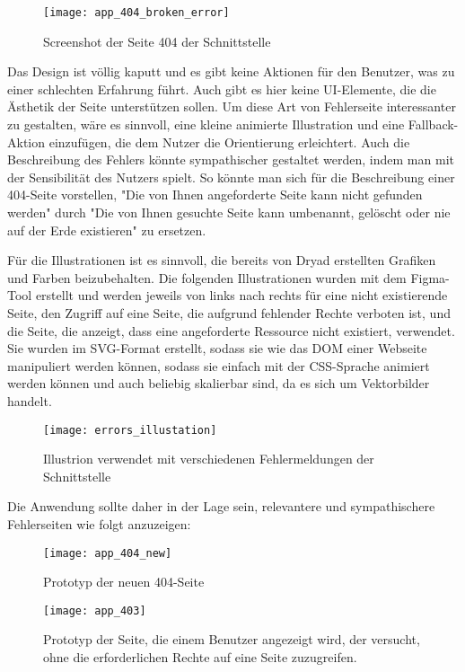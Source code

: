 \begin{figure}[H]
  \centering
  \texttt{[image: app\_404\_broken\_error]}
  \caption{Screenshot der Seite 404 der Schnittstelle}
  \label{fig:app_404_broken_error}
\end{figure}

Das Design ist völlig kaputt und es gibt keine Aktionen für den Benutzer, was zu einer schlechten Erfahrung führt.
Auch gibt es hier keine UI-Elemente, die die Ästhetik der Seite unterstützen sollen.
Um diese Art von Fehlerseite interessanter zu gestalten, wäre es sinnvoll, eine kleine animierte Illustration und eine Fallback-Aktion einzufügen, die dem Nutzer die Orientierung erleichtert.
Auch die Beschreibung des Fehlers könnte sympathischer gestaltet werden, indem man mit der Sensibilität des Nutzers spielt.
So könnte man sich für die Beschreibung einer 404-Seite vorstellen, "Die von Ihnen angeforderte Seite kann nicht gefunden werden" durch "Die von Ihnen gesuchte Seite kann umbenannt, gelöscht oder nie auf der Erde existieren" zu ersetzen.

Für die Illustrationen ist es sinnvoll, die bereits von Dryad erstellten Grafiken und Farben beizubehalten.
Die folgenden Illustrationen wurden mit dem Figma-Tool erstellt und werden jeweils von links nach rechts für eine nicht existierende Seite, den Zugriff auf eine Seite, die aufgrund fehlender Rechte verboten ist, und die Seite, die anzeigt, dass eine angeforderte Ressource nicht existiert, verwendet.
Sie wurden im \ac{SVG}-Format erstellt, sodass sie wie das \ac{DOM} einer Webseite manipuliert werden können, sodass sie einfach mit der \ac{CSS}-Sprache animiert werden können und auch beliebig skalierbar sind, da es sich um Vektorbilder handelt.

\begin{figure}[H]
  \centering
  \texttt{[image: errors\_illustation]}
  \caption{Illustrion verwendet mit verschiedenen Fehlermeldungen der Schnittstelle}
  \label{fig:errors_illustation}
\end{figure}

Die Anwendung sollte daher in der Lage sein, relevantere und sympathischere Fehlerseiten wie folgt anzuzeigen:

\begin{figure}[H]
  \centering
  \texttt{[image: app\_404\_new]}
  \caption{Prototyp der neuen 404-Seite}
  \label{fig:app_404_new}
\end{figure}

\begin{figure}[H]
  \centering
  \texttt{[image: app\_403]}
  \caption{Prototyp der Seite, die einem Benutzer angezeigt wird, der versucht, ohne die erforderlichen Rechte auf eine Seite zuzugreifen.}
  \label{fig:app_403}
\end{figure}

